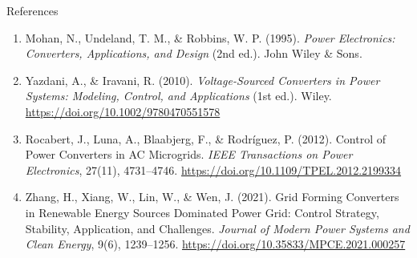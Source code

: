 \begin{frame}{References}
  \footnotesize
  \begin{enumerate}
    \item Mohan, N., Undeland, T. M., \& Robbins, W. P. (1995). \emph{Power Electronics: Converters, Applications, and Design} (2nd ed.). John Wiley \& Sons.
    \item Yazdani, A., \& Iravani, R. (2010). \emph{Voltage-Sourced Converters in Power Systems: Modeling, Control, and Applications} (1st ed.). Wiley. \url{https://doi.org/10.1002/9780470551578}
    \item Rocabert, J., Luna, A., Blaabjerg, F., \& Rodríguez, P. (2012). Control of Power Converters in AC Microgrids. \emph{IEEE Transactions on Power Electronics}, 27(11), 4731--4746. \url{https://doi.org/10.1109/TPEL.2012.2199334}
    \item Zhang, H., Xiang, W., Lin, W., \& Wen, J. (2021). Grid Forming Converters in Renewable Energy Sources Dominated Power Grid: Control Strategy, Stability, Application, and Challenges. \emph{Journal of Modern Power Systems and Clean Energy}, 9(6), 1239--1256. \url{https://doi.org/10.35833/MPCE.2021.000257}
  \end{enumerate}
\end{frame}
